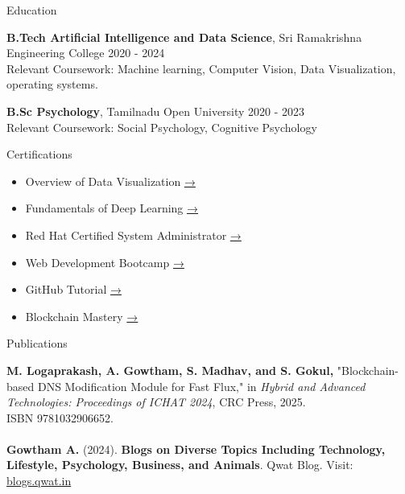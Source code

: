 \documentclass{resume} %
\begin{document}
\begin{rSection}{Education}

{\bf B.Tech Artificial Intelligence and Data
Science}, Sri Ramakrishna Engineering
College \hfill {2020 - 2024}\\
Relevant Coursework: Machine learning, Computer Vision, Data Visualization, operating systems.

{\bf B.Sc Psychology}, Tamilnadu Open University \hfill {2020 - 2023} \\
Relevant Coursework: Social Psychology, Cognitive Psychology


\end{rSection}

\begin{rSection}{Certifications } 
\begin{itemize}
    \item Overview of Data Visualization \href{https://www.coursera.org/account/accomplishments/verify/9XH2ALR8KBNV}{→}
    \item Fundamentals of Deep Learning \href{https://learn.nvidia.com/certificates?id=e46d86c53f1647bfbc2eebaafbed88bc}{→} 
    \item Red Hat Certified System Administrator \href{https://www.coursera.org/account/accomplishments/verify/9XH2ALR8KBNV}{→} 
    \item Web Development Bootcamp  \href{https://www.mygreatlearning.com/certificate/WQCNEJYZ}{→}
    \item GitHub Tutorial \href{https://www.mygreatlearning.com/certificate/YLGEWEGH}{→}
    \item Blockchain Mastery \href{https://www.udemy.com/certificate/UC-ffd8e16b-7f68-4eeb-9b8f-c2725a95b8a2/}{→}
\end{itemize}


\end{rSection}


\begin{rSection}{Publications}

{\bf M. Logaprakash, A. Gowtham, S. Madhav, and S. Gokul,} "Blockchain-based DNS Modification Module for Fast Flux," in \emph{Hybrid and Advanced Technologies: Proceedings of ICHAT 2024}, CRC Press, 2025. \\ISBN 9781032906652.\\
\\
{\bf Gowtham A.} (2024).  
\textbf{Blogs on Diverse Topics Including Technology, Lifestyle, Psychology, Business, and Animals}. Qwat Blog.  
Visit: \href{https://blog.qwat.in}{blogs.qwat.in}

\end{rSection}
\end{document}
